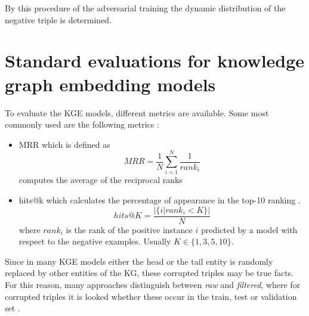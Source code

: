 By this procedure of the adversarial training the dynamic distribution of the negative triple is determined. 

\section{Standard evaluations for knowledge graph embedding models} 
To evaluate the \ac{KGE} models, different metrics are available.
Some most commonly used are the following metrics \cite{kotnis2017analysis}:
\begin{itemize}
    \item 
    \ac{MRR} which is defined as
    \begin{equation}
        MRR = \frac{1}{N} \sum_{i=1}^{N}\frac{1}{rank_i}
    \end{equation}
    computes the average of the reciprocal ranks \cite{zhang2021efficient}
    
    \item 
    hits@k which calculates the percentage of appearance in the top-10 ranking \cite{zhang2021efficient}.
    \begin{equation}
        hits@K = \frac{|\{i | rank_i < K\}|}{N}
    \end{equation}
    where $rank_i$ is the rank of the positive instance $i$ predicted by a model with respect to the negative examples.
    Usually $K \in \{1, 3, 5, 10\}$.
\end{itemize}
Since in many \ac{KGE} models either the head or the tail entity is randomly replaced by other entities of the KG, these corrupted triples may be true facts.
For this reason, many approaches distinguish between \textit{raw} and \textit{filtered}, where for corrupted triples it is looked whether these occur in the train, test or validation set \cite{TransE}.

